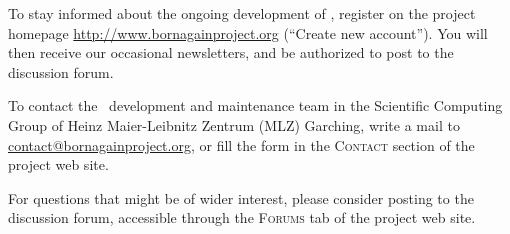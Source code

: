 To stay informed about the ongoing development of \BornAgain,
register on the project homepage \url{http://www.bornagainproject.org}
(``Create new account'').
You will then receive our occasional newsletters,
and be authorized to post to the discussion forum.

To contact the \BornAgain\ development and maintenance team
in the Scientific Computing Group
of Heinz Maier-Leibnitz Zentrum (MLZ) Garching,
write a mail to \url{contact@bornagainproject.org},
or fill the form in the \textsc{Contact} section of the
project web site.

For questions that might be of wider interest,
please consider posting to the discussion forum,
accessible through the \textsc{Forums} tab of the project web site.
